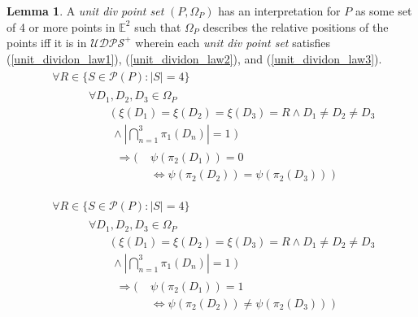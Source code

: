 \documentclass[11pt, oneside]{article}      %
\theoremstyle{definition}
\newtheorem{lem}{Lemma}
\numberwithin{equation}{section}
\newcommand{\reff}[1]{(\ref{#1})}
\theoremstyle{c}
\begin{document}
\begin{lem}
A \textit{unit div point set} $(P,\Omega_P)$ has an interpretation for $P$ as some set of 4 or more points in $\mathbb{E}^2$ such that $\Omega_P$ describes the relative positions of the points iff it is in $\mathscr{UDPS}^+$ wherein each \textit{unit div point set} satisfies \reff{unit_dividon_law1}, \reff{unit_dividon_law2}, and \reff{unit_dividon_law3}.
\begin{align}
\begin{split}
\label{unit_dividon_law1}
&\forall R \in \{ S \in \mathcal{P}(P) : |S| =4 \} \\
&\begin{aligned}\qquad &\forall D_1, D_2, D_3 \in \Omega_P \\
&\qquad (\; \xi(D_1) =\xi(D_2) =\xi(D_3) = R \land D_1 \not= D_2 \not= D_3 \\
&\qquad \land  |\bigcap_{n=1}^{3} \pi_1(D_n)|= 1 \; )\\
&\begin{aligned}\qquad \Rightarrow ( \; &\psi(\pi_2(D_1)) = 0 \\
&\Leftrightarrow \psi(\pi_2(D_2)) = \psi(\pi_2(D_3)) \; ) \\
\end{aligned} \end{aligned} \end{split}
\end{align}
\begin{align}\begin{split}
\label{unit_dividon_law2}
&\forall R \in \{ S \in \mathcal{P}(P) : |S| =4 \} \\
&\begin{aligned}\qquad  &\forall D_1, D_2, D_3 \in \Omega_P  \\
&\qquad (\; \xi(D_1) =\xi(D_2) =\xi(D_3) = R \land D_1 \not= D_2 \not= D_3 \\
&\qquad  \land  |\bigcap_{n=1}^{3} \pi_1(D_n)|= 1 \;) \\
&\begin{aligned}\qquad \Rightarrow ( \; &\psi(\pi_2(D_1))  = 1 \\
&\Leftrightarrow \psi(\pi_2(D_2))  \not= \psi(\pi_2(D_3))  \; ) \\
\end{aligned} \end{aligned} \end{split}
\end{align}
\begin{align}
\begin{split}\label{unit_dividon_law3}

\end{split}
\end{align}
\end{lem}
\end{document}
